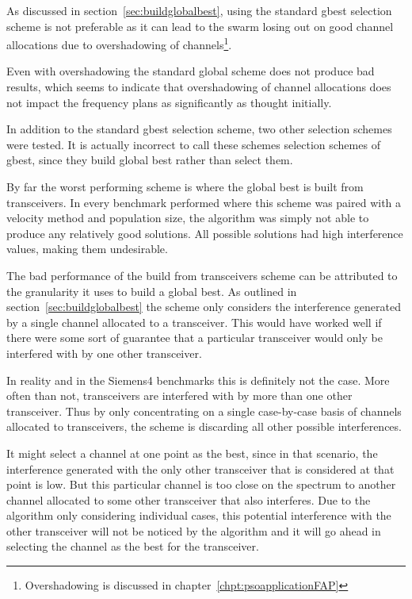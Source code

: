 As discussed in section~\ref{sec:buildglobalbest}, using the standard gbest selection scheme is not preferable as it can lead to the swarm losing out on good channel allocations due to overshadowing of channels\footnote{Overshadowing is discussed in chapter~\ref{chpt:psoapplicationFAP}}.

Even with overshadowing the standard global scheme does not produce bad results, which seems to indicate that overshadowing of channel allocations does not impact the frequency plans as significantly as thought initially.

In addition to the standard gbest selection scheme, two other selection schemes were tested. It is actually incorrect to call these schemes selection schemes of gbest, since they build global best rather than select them.

By far the worst performing scheme is where the global best is built from transceivers. In every benchmark performed where this scheme was paired with a velocity method and population size, the algorithm was simply not able to produce any relatively good solutions. All possible solutions had high interference values, making them undesirable.

The bad performance of the build from transceivers scheme can be attributed to the granularity it uses to build a global best. As outlined in section~\ref{sec:buildglobalbest} the scheme only considers the interference generated by a single channel allocated to a transceiver. This would have worked well if there were some sort of guarantee that a particular transceiver would only be interfered with by one other transceiver.

In reality and in the Siemens4 benchmarks this is definitely not the case. More often than not, transceivers are interfered with by more than one other transceiver. Thus by only concentrating on a single case-by-case basis of channels allocated to transceivers, the scheme is discarding all other possible interferences. 

It might select a channel at one point as the best, since in that scenario, the interference generated with the only other transceiver that is considered at that point is low. But this particular channel is too close on the spectrum to another channel allocated to some other transceiver that also interferes. Due to the algorithm only considering individual cases, this potential interference with the other transceiver will not be noticed by the algorithm and it will go ahead in selecting the channel as the best for the transceiver.

